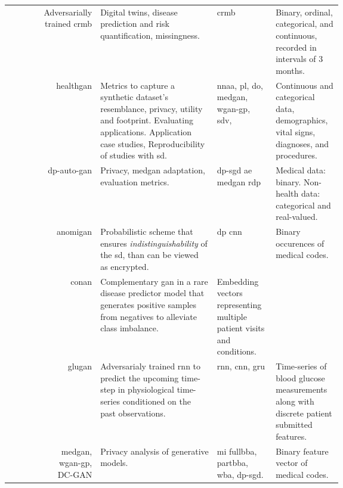 \begin{landscape}
\begin{longtable}[l]{@{}p{0.10\linewidth}Rp{0.35\linewidth}Mp{0.20\linewidth}@{}}
        \citeauthor{walsh2020generating} & Adversarially trained \gls{crmb}
        & Digital twins, disease prediction and risk quantification, missingness.  & \gls{crmb}
        &  Binary, ordinal, categorical, and continuous, recorded in intervals of 3 months.\\
        
        \citeauthor{Yale_2020} & \gls{healthgan}
        & Metrics to capture a synthetic dataset’s resemblance, privacy, utility and footprint. Evaluating applications. Application case studies, Reproducibility of studies with \gls{sd}. & \gls{nnaa}, \gls{pl}, \gls{do}, \gls{medgan}, \gls{wgan-gp}, \gls{sdv}, 
        & Continuous and categorical data, demographics, vital signs, diagnoses, and procedures.\\
        
        \citeauthor{tanti2019} & \gls{dp-auto-gan}
        & Privacy, \gls{medgan} adaptation, evaluation metrics. & \gls{dp-sgd} \gls{ae} \gls{medgan} \gls{rdp}
        & Medical data: binary. Non-health data: categorical and real-valued.\\
        
        \citeauthor{BaeAnomiGAN2020} & \gls{anomigan}
        & Probabilistic scheme that ensures \textit{indistinguishability} of the \gls{sd}, than can be viewed as encrypted. & \gls{dp} \gls{cnn}
        & Binary occurences of medical codes.\\
        
        \citeauthor{cui2019conan} & \gls{conan}
        & Complementary \gls{gan} in a rare disease predictor model that generates positive samples from negatives to alleviate class imbalance.
        & Embedding vectors representing multiple patient visits and conditions.\\
        
        \citeauthor{zhu_2020} & \gls{glugan}
        & Adversarialy trained \gls{rnn} to predict the upcoming time-step in physiological time-series conditioned on the past observations. & \gls{rnn}, \gls{cnn}, \gls{gru}
        & Time-series of blood glucose measurements along with discrete patient submitted features.\\
        
        \citeauthor{chen2019ganleaks} & \gls{medgan}, \gls{wgan-gp}, DC-GAN
        & Privacy analysis of generative models.  & \gls{mi} \gls{fullbba}, \gls{partbba}, \gls{wba}, \gls{dp-sgd}.
        & Binary feature vector of medical codes.\\
        

\end{longtable}
\end{landscape}
